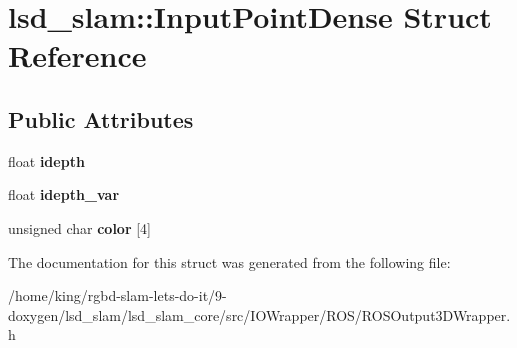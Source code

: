 \hypertarget{structlsd__slam_1_1_input_point_dense}{\section{lsd\-\_\-slam\-:\-:Input\-Point\-Dense Struct Reference}
\label{structlsd__slam_1_1_input_point_dense}
}
\subsection*{Public Attributes}
\begin{DoxyCompactItemize}
\item 
\hypertarget{structlsd__slam_1_1_input_point_dense_ad3277043db986bfcd8af8320ab36baad}{float {\bfseries idepth}}\label{structlsd__slam_1_1_input_point_dense_ad3277043db986bfcd8af8320ab36baad}

\item 
\hypertarget{structlsd__slam_1_1_input_point_dense_a105d1eb019fe8bb5fb4b2760e5f98f75}{float {\bfseries idepth\-\_\-var}}\label{structlsd__slam_1_1_input_point_dense_a105d1eb019fe8bb5fb4b2760e5f98f75}

\item 
\hypertarget{structlsd__slam_1_1_input_point_dense_ae85556d429ada57ea06a8a38ca5bca33}{unsigned char {\bfseries color} \mbox{[}4\mbox{]}}\label{structlsd__slam_1_1_input_point_dense_ae85556d429ada57ea06a8a38ca5bca33}

\end{DoxyCompactItemize}


The documentation for this struct was generated from the following file\-:\begin{DoxyCompactItemize}
\item 
/home/king/rgbd-\/slam-\/lets-\/do-\/it/9-\/doxygen/lsd\-\_\-slam/lsd\-\_\-slam\-\_\-core/src/\-I\-O\-Wrapper/\-R\-O\-S/R\-O\-S\-Output3\-D\-Wrapper.\-h\end{DoxyCompactItemize}
